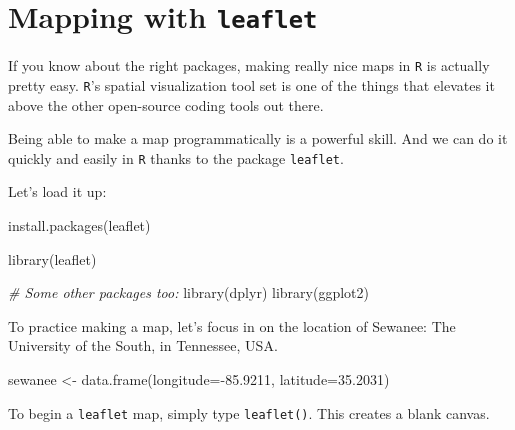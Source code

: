 \documentclass[
]{book}
\newenvironment{Shaded}{\begin{snugshade}}{\end{snugshade}}
\newcommand{\AttributeTok}[1]{\textcolor[rgb]{0.77,0.63,0.00}{#1}}
\newcommand{\CommentTok}[1]{\textcolor[rgb]{0.56,0.35,0.01}{\textit{#1}}}
\newcommand{\FloatTok}[1]{\textcolor[rgb]{0.00,0.00,0.81}{#1}}
\newcommand{\FunctionTok}[1]{\textcolor[rgb]{0.00,0.00,0.00}{#1}}
\newcommand{\NormalTok}[1]{#1}
\newcommand{\OtherTok}[1]{\textcolor[rgb]{0.56,0.35,0.01}{#1}}
\newcommand{\SpecialCharTok}[1]{\textcolor[rgb]{0.00,0.00,0.00}{#1}}
\newcommand{\StringTok}[1]{\textcolor[rgb]{0.31,0.60,0.02}{#1}}
\begin{document}
\hypertarget{mapping-with-leaflet}{%
\section*{\texorpdfstring{Mapping with \texttt{leaflet}}{Mapping with leaflet}}\label{mapping-with-leaflet}}

If you know about the right packages, making really nice maps in \texttt{R} is actually pretty easy. \texttt{R}'s spatial visualization tool set is one of the things that elevates it above the other open-source coding tools out there.

Being able to make a map programmatically is a powerful skill. And we can do it quickly and easily in \texttt{R} thanks to the package \texttt{leaflet}.

Let's load it up:

\begin{Shaded}
\begin{Highlighting}[]
\FunctionTok{install.packages}\NormalTok{(}\StringTok{\textquotesingle{}leaflet\textquotesingle{}}\NormalTok{)}
\end{Highlighting}
\end{Shaded}

\begin{Shaded}
\begin{Highlighting}[]
\FunctionTok{library}\NormalTok{(leaflet)}

\CommentTok{\# Some other packages too:}
\FunctionTok{library}\NormalTok{(dplyr)}
\FunctionTok{library}\NormalTok{(ggplot2)}
\end{Highlighting}
\end{Shaded}

To practice making a map, let's focus in on the location of Sewanee: The University of the South, in Tennessee, USA.

\begin{Shaded}
\begin{Highlighting}[]
\NormalTok{sewanee }\OtherTok{\textless{}{-}} \FunctionTok{data.frame}\NormalTok{(}\AttributeTok{longitude=}\SpecialCharTok{{-}}\FloatTok{85.9211}\NormalTok{, }
                      \AttributeTok{latitude=}\FloatTok{35.2031}\NormalTok{)}
\end{Highlighting}
\end{Shaded}

To begin a \texttt{leaflet} map, simply type \texttt{leaflet()}. This creates a blank canvas.
\end{document}
